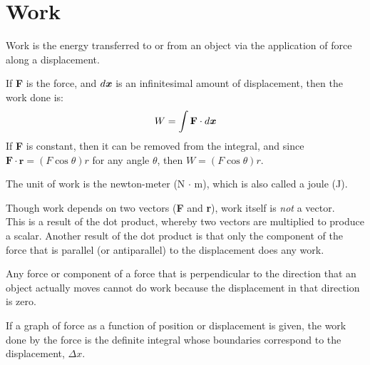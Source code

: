 \documentclass{article}
\begin{document}
\section{Work}
\begin{definition}
    Work is the energy transferred to or from an object via the application of force along a displacement.
\end{definition}
If \textbf{F} is the force, and $d \textbf{\textit{x}}$ is an infinitesimal amount of displacement, then the work done is:
\begin{equation*}
    W = \int \textbf{F} \cdot d \textbf{\textit{x}}
\end{equation*}
If \textbf{F} is constant, then it can be removed from the integral, and since $\textbf{F} \cdot \textbf{r} = (F\cos\theta)r$ for any angle $\theta$, then $W = (F\cos\theta)r$.
\begin{unit}
    The unit of work is the newton-meter (N $\cdot$ m), which is also called a joule (J).
\end{unit}
\newpage
\begin{note}
    Though work depends on two vectors (\textbf{F} and \textbf{r}), work itself is \textit{not} a vector. \\
This is a result of the dot product, whereby two vectors are multiplied to produce a scalar. Another result of the dot product is that only the component of the force that is parallel (or antiparallel) to the displacement does any work.
\end{note}
\begin{note}
    Any force or component of a force that is perpendicular to the direction that an object actually moves cannot do work because the displacement in that direction is zero.
\end{note}
\begin{note}
    If a graph of force as a function of position or displacement is given, the work done by the force is the definite integral whose boundaries correspond to the displacement, $\Delta x$.
\end{note}
\end{document}

